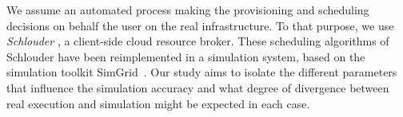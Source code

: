 We assume an automated process  making the provisioning and scheduling decisions
on  behalf  the user  on  the  real infrastructure.   To  that  purpose, we  use
\emph{Schlouder} \cite{}, a client-side cloud resource broker.  These scheduling
algorithms of Schlouder have been reimplemented in a simulation system, based on
the simulation toolkit SimGrid~\cite{simgrid08}.   Our study aims to isolate the
different parameters that  influence the simulation accuracy and  what degree of
divergence between real execution and simulation might be expected in each case.






\begin{comment}
[9] R. N. Calheiros, R. Ranjan, A. Beloglazov, C. A. D. Rose, and R. Buyya, “CloudSim: a toolkit for modeling and simulation of cloud computing environments and evaluation of resource provisioning algo- rithms,” Software: Practice and Experience, vol. 41, no. 1, pp. 23–50,
2011.
[10] D. Kliazovich, P. Bouvry, and S. U. Khan, “GreenCloud: a packet-level simulator of energy-aware cloud computing data centers,” The Journal of Supercomputing, vol. 62, no. 3, pp. 1263–1283, 2012.

[11] B. Wickremasinghe, R. N. Calheiros, and R. Buyya, “Cloudanalyst: A CloudSim-based visual modeller for analysing cloud computing environments and applications,” in Advanced Information Networking
and Applications (AINA), 2010 24th IEEE International Conference on.
IEEE, 2010, pp. 446–452.

[12] S. K. Garg and R. Buyya, “Networkcloudsim: Modelling parallel applications in cloud simulations,” in Utility and Cloud Computing
(UCC), 2011 Fourth IEEE International Conference on. IEEE, 2011,
pp. 105–113.

[13] M. Tighe, G. Keller, M. Bauer, and H. Lutfiyya, “DCSim: A data centre simulation tool for evaluating dynamic virtualized resource management,” in Network and service management (cnsm), 2012 8th
international conference and 2012 workshop on systems virtualiztion
management (svm), Oct 2012, pp. 385–392.

[14] S. K. S. Gupta, R. Gilbert, A. Banerjee, Z. Abbasi, T. Mukherjee, and G. Varsamopoulos, “GDCSim: A tool for analyzing Green Data Center design and resource management techniques,” in Green Computing
Conference and Workshops (IGCC), 2011 International, July 2011, pp.
1–8.
\end{comment}

 
  